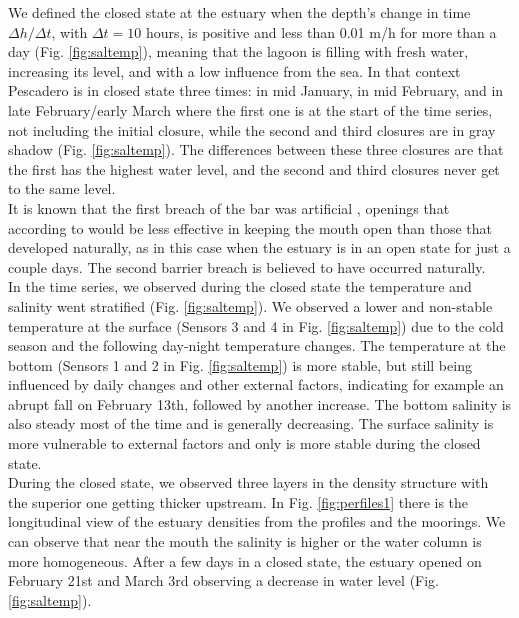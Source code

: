 \documentclass[tesis.tex]{subfiles}
\begin{document}
We defined the closed state at the estuary when the depth's change in time $\Delta h/\Delta t$, with $\Delta t=10$ hours, is positive and less than 0.01 m/h for more than a day (Fig. \ref{fig:saltemp}), meaning that the lagoon is filling with fresh water, increasing its level, and with a low influence from the sea. In that context Pescadero is in closed state three times: in mid January, in mid February, and in late February/early March where the first one is at the start of the time series, not including the initial closure, while the second and third closures are in gray shadow (Fig. \ref{fig:saltemp}). The differences between these three closures are that the first has the highest water level, and the second and third closures never get to the same level. \\

It is known that the first breach of the bar was artificial \citep{Williams2014}, openings that according to \cite{Behrens2013} would be less effective in keeping the mouth open than those that developed naturally, as in this case when the estuary is in an open state for just a couple days. The second barrier breach is believed to have occurred naturally. \\

In the time series, we observed during the closed state the temperature and salinity went stratified (Fig. \ref{fig:saltemp}). We observed a lower and non-stable temperature at the surface (Sensors 3 and 4 in Fig. \ref{fig:saltemp}) due to the cold season and the following day-night temperature changes. The temperature at the bottom (Sensors 1 and 2 in Fig. \ref{fig:saltemp}) is more stable, but still being influenced by daily changes and other external factors, indicating for example an abrupt fall on February 13th, followed by another increase. The bottom salinity is also steady most of the time and is generally decreasing. The surface salinity is more vulnerable to external factors and only is more stable during the closed state. \\ 

During the closed state, we observed three layers in the density structure with the superior one getting thicker upstream. In Fig. \ref{fig:perfiles1} there is the longitudinal view of the estuary densities from the profiles and the moorings. We can observe that near the mouth the salinity is higher or the water column is more homogeneous. After a few days in a closed state, the estuary opened on February 21st and March 3rd observing a decrease in water level (Fig. \ref{fig:saltemp}). \\
\end{document}
